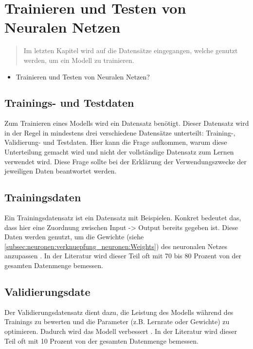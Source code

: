 \newpage
\thispagestyle{empty}
\section{Trainieren und Testen von Neuralen Netzen}\label{sec:trainierentesten}   
\begin{tcolorbox}[title={Inhalte von \textit{Trainings- und Testdaten}}]
  \begin{quotation}\noindent
    Im letzten Kapitel wird auf die Datensätze eingegangen, welche genutzt werden, um ein Modell zu trainieren.
  \end{quotation}
  \begin{itemize}
    \item Trainieren und Testen von Neuralen Netzen?


  \end{itemize}
\end{tcolorbox}

\subsection{Trainings- und Testdaten}\label{subsecsec:trainierentesten:daten}   
Zum Trainieren eines Modells wird ein Datensatz benötigt. Dieser Datensatz wird in der Regel in mindestens drei verschiedene Datensätze unterteilt: Training-, Validierung- und Testdaten.
Hier kann die Frage aufkommen, warum diese Unterteilung gemacht wird und nicht der vollständige Datensatz zum Lernen verwendet wird. 
Diese Frage sollte bei der Erklärung der Verwendungszwecke der jeweiligen Daten beantwortet werden.

\subsection{Trainingsdaten}
Ein Trainingsdatensatz ist ein Datensatz mit Beispielen. Konkret bedeutet das, dass hier eine Zuordnung zwischen Input -> Output bereits gegeben ist.
Diese Daten werden genutzt, um die Gewichte (siehe \ref*{subsec:neuronen:verknuepfung_neuronen:Weights}) des neuronalen Netzes anzupassen \cite[Seite 2ff]{CA18}.
In der Literatur wird dieser Teil oft mit 70 bis 80 Prozent von der gesamten Datenmenge bemessen.

\subsection{Validierungsdate}
Der Validierungsdatensatz dient dazu, die Leistung des Modells während des Trainings zu bewerten und die Parameter (z.B. Lernrate oder Gewichte) zu optimieren. 
Dadurch wird das Modell verbessert \cite[Seite 20]{CA18}.
In der Literatur wird dieser Teil oft mit 10 Prozent von der gesamten Datenmenge bemessen.

